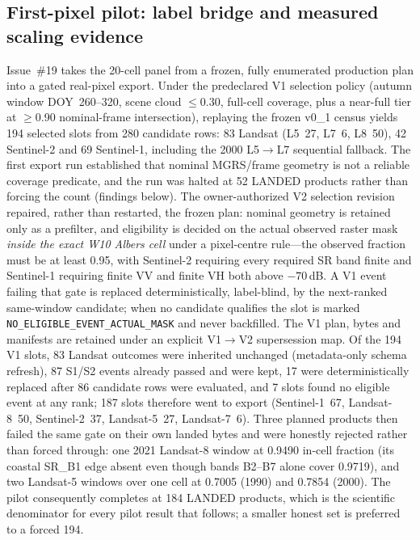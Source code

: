 \subsection{First-pixel pilot: label bridge and measured scaling evidence}
\label{sec:pilot19}
Issue~\#19 takes the 20-cell panel from a frozen, fully
enumerated production plan into a gated real-pixel export. Under the
predeclared V1 selection policy (autumn window DOY~260--320, scene
cloud $\le$0.30, full-cell coverage, plus a near-full tier at
$\ge$0.90 nominal-frame intersection), replaying the frozen v0\_1
census yields 194 selected slots from 280 candidate rows: 83 Landsat
(L5~27, L7~6, L8~50), 42 Sentinel-2 and 69 Sentinel-1, including the
2000 L5$\rightarrow$L7 sequential fallback. The first export run
established that nominal MGRS/frame geometry is not a reliable
coverage predicate, and the run was halted at 52 LANDED products
rather than forcing the count (findings below). The owner-authorized
V2 selection revision repaired, rather than restarted, the frozen
plan: nominal geometry is retained only as a prefilter, and eligibility
is decided on the actual observed raster mask \emph{inside the exact
W10 Albers cell} under a pixel-centre rule---the observed fraction must
be at least 0.95, with Sentinel-2 requiring every required SR band
finite and Sentinel-1 requiring finite VV and finite VH both above
$-70$\,dB. A V1 event failing that gate is replaced deterministically,
label-blind, by the next-ranked same-window candidate; when no
candidate qualifies the slot is marked
\texttt{NO\_ELIGIBLE\_EVENT\_ACTUAL\_MASK} and never backfilled. The
V1 plan, bytes and manifests are retained under an explicit
V1$\rightarrow$V2 supersession map. Of the 194 V1 slots, 83 Landsat
outcomes were inherited unchanged (metadata-only schema refresh), 87
S1/S2 events already passed and were kept, 17 were deterministically
replaced after 86 candidate rows were evaluated, and 7 slots found no
eligible event at any rank; 187 slots therefore went to export
(Sentinel-1~67, Landsat-8~50, Sentinel-2~37, Landsat-5~27,
Landsat-7~6). Three planned products then failed the same gate on
their own landed bytes and were honestly rejected rather than forced
through: one 2021 Landsat-8 window at 0.9490 in-cell fraction (its
coastal SR\_B1 edge absent even though bands B2--B7 alone cover
0.9719), and two Landsat-5 windows over one cell at 0.7005 (1990) and
0.7854 (2000). The pilot consequently completes at 184 LANDED
products, which is the scientific denominator for every pilot result
that follows; a smaller honest set is preferred to a forced 194.

